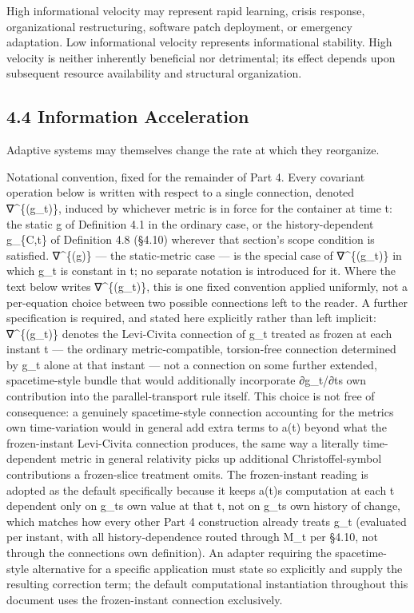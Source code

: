 \documentclass[
]{article}
\begin{document}
High informational velocity may represent rapid learning, crisis
response, organizational restructuring, software patch deployment, or
emergency adaptation. Low informational velocity represents
informational stability. High velocity is neither inherently beneficial
nor detrimental; its effect depends upon subsequent resource
availability and structural organization.

\hypertarget{information-acceleration}{%
\subsection{4.4 Information
Acceleration}\label{information-acceleration}}

Adaptive systems may themselves change the rate at which they
reorganize.

Notational convention, fixed for the remainder of Part 4. Every
covariant operation below is written with respect to a single
connection, denoted ∇\^{}\{(g\_t)\}, induced by whichever metric is in
force for the container at time t: the static g of Definition 4.1 in the
ordinary case, or the history-dependent g\_\{C,t\} of Definition 4.8
(§4.10) wherever that section's scope condition is satisfied.
∇\^{}\{(g)\} --- the static-metric case --- is the special case of
∇\^{}\{(g\_t)\} in which g\_t is constant in t; no separate notation is
introduced for it. Where the text below writes ∇\^{}\{(g\_t)\}, this is
one fixed convention applied uniformly, not a per-equation choice
between two possible connections left to the reader. A further
specification is required, and stated here explicitly rather than left
implicit: ∇\^{}\{(g\_t)\} denotes the Levi-Civita connection of g\_t
treated as frozen at each instant t --- the ordinary metric-compatible,
torsion-free connection determined by g\_t alone at that instant --- not
a connection on some further extended, spacetime-style bundle that would
additionally incorporate ∂g\_t/∂t\textquotesingle s own contribution
into the parallel-transport rule itself. This choice is not free of
consequence: a genuinely spacetime-style connection accounting for the
metric\textquotesingle s own time-variation would in general add extra
terms to a(t) beyond what the frozen-instant Levi-Civita connection
produces, the same way a literally time-dependent metric in general
relativity picks up additional Christoffel-symbol contributions a
frozen-slice treatment omits. The frozen-instant reading is adopted as
the default specifically because it keeps a(t)\textquotesingle s
computation at each t dependent only on g\_t\textquotesingle s own value
at that t, not on g\_t\textquotesingle s own history of change, which
matches how every other Part 4 construction already treats g\_t
(evaluated per instant, with all history-dependence routed through M\_t
per §4.10, not through the connection\textquotesingle s own definition).
An adapter requiring the spacetime-style alternative for a specific
application must state so explicitly and supply the resulting correction
term; the default computational instantiation throughout this document
uses the frozen-instant connection exclusively.
\end{document}
